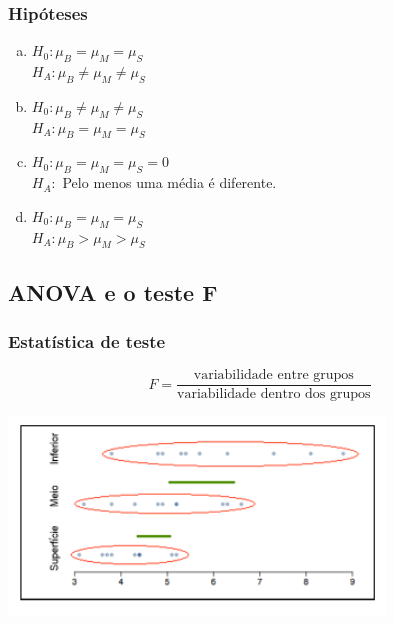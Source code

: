 
\begin{frame}
\frametitle{Hipóteses}
\justifying
{}

\begin{enumerate}[(a)]
\item $H_0: \mu_B = \mu_M = \mu_S$ \\
$H_A: \mu_B \ne \mu_M \ne \mu_S$ \\
\item $H_0: \mu_B \ne \mu_ M \ne \mu_S$ \\
$H_A: \mu_B = \mu_M = \mu_S$ \\
\item $H_0: \mu_B = \mu_M = \mu_S = 0$ \\
$H_A:$ Pelo menos uma média é diferente.
\item $H_0: \mu_B = \mu_M = \mu_S$ \\
$H_A: \mu_B > \mu_M > \mu_S$ \\
\end{enumerate}

\end{frame}


\subsection{ANOVA e o teste F}


\begin{frame}
\frametitle{Estatística de teste}
\justifying
{}
\justifying
\[ F = \frac{\text{variabilidade entre grupos}}{\text{variabilidade dentro dos grupos}}  \]

\begin{center}
\includegraphics[width=0.75\textwidth]{5-5_anova/dotplot_var.png}
\end{center}

\end{frame}

